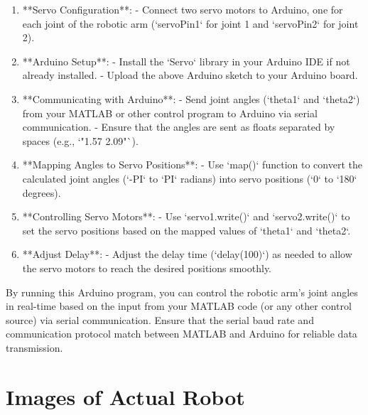 \documentclass{article}
\begin{document}
\begin{enumerate}
  \item **Servo Configuration**:
     - Connect two servo motors to Arduino, one for each joint of the robotic arm (`servoPin1` for joint 1 and `servoPin2` for joint 2).
  
  \item **Arduino Setup**:
     - Install the `Servo` library in your Arduino IDE if not already installed.
     - Upload the above Arduino sketch to your Arduino board.
  
  \item **Communicating with Arduino**:
     - Send joint angles (`theta1` and `theta2`) from your MATLAB or other control program to Arduino via serial communication.
     - Ensure that the angles are sent as floats separated by spaces (e.g., `"1.57 2.09"`).
  
  \item **Mapping Angles to Servo Positions**:
     - Use `map()` function to convert the calculated joint angles (`-PI` to `PI` radians) into servo positions (`0` to `180` degrees).
  
  \item **Controlling Servo Motors**:
     - Use `servo1.write()` and `servo2.write()` to set the servo positions based on the mapped values of `theta1` and `theta2`.
  
  \item **Adjust Delay**:
     - Adjust the delay time (`delay(100)`) as needed to allow the servo motors to reach the desired positions smoothly.
\end{enumerate}

By running this Arduino program, you can control the robotic arm's joint angles in real-time based on the input from your MATLAB code (or any other control source) via serial communication. Ensure that the serial baud rate and communication protocol match between MATLAB and Arduino for reliable data transmission.

\section{Images of Actual Robot}
\FloatBarrier
\end{document}
